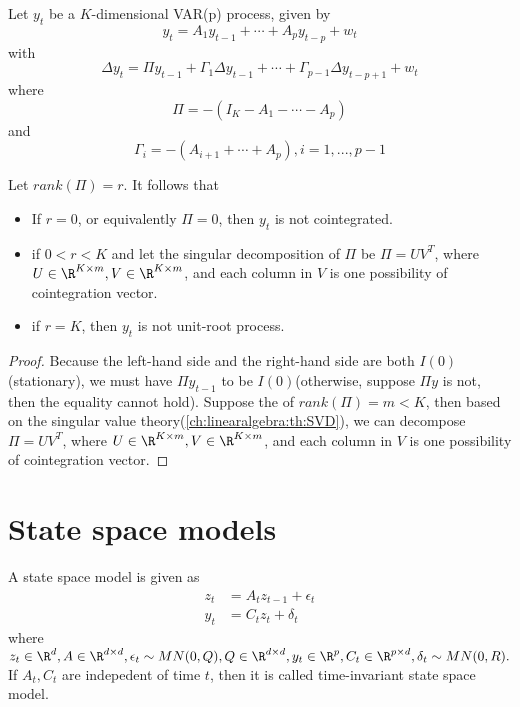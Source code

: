 \begin{lemma}\cite[248]{lutkepohl2005new}
Let $y_t$ be a $K$-dimensional VAR(p) process, given by
$$y_t = A_1y_{t-1} + \cdots + A_py_{t-p} + w_t$$
with
$$\Delta y_t = \Pi y_{t-1} + \Gamma_1\Delta y_{t-1} + \cdots + \Gamma_{p-1}\Delta y_{t-p+1} + w_t$$
where
$$\Pi = - (I_K - A_1 - \cdots - A_p)$$
and
$$\Gamma_i = -(A_{i+1}+\cdots + A_p), i=1,...,p-1$$

Let $rank(\Pi) = r$.
It follows that
\begin{itemize}
	\item If $r = 0$, or equivalently $\Pi = 0$, then $y_t$ is not cointegrated.
	\item if $0<r <K$ and let the singular decomposition of $\Pi$ be $\Pi = UV^T$, where $U\in \R^{K\times m}, V\in \R^{K\times m}$, and each column in $V$ is one possibility of cointegration vector. 
	\item if $r=K$, then $y_t$ is not unit-root process.
\end{itemize}


\end{lemma}
\begin{proof}	
Because the left-hand side and the right-hand side are both $I(0)$(stationary), we must have $\Pi y_{t-1}$ to be $I(0)$(otherwise, suppose $\Pi y$ is not, then the equality cannot hold).	
Suppose the of $rank(\Pi) = m < K$, then based on the singular value theory(\autoref{ch:linearalgebra:th:SVD}), we can decompose $\Pi = UV^T$, where $U\in \R^{K\times m}, V\in \R^{K\times m}$, and each column in $V$ is one possibility of cointegration vector. 

\end{proof}


\begin{note}\cite[249]{lutkepohl2005new}
\end{note}

\section{State space models}
\begin{definition}
A state space model is given as
\begin{align*}
z_t &= A_tz_{t-1} + \epsilon_t\\
y_t &=C_tz_t + \delta_t
\end{align*}
where $z_t\in \R^d,A\in \R^{d\times d}, \epsilon_t \sim MN(0,Q), Q\in \R^{d\times d}, y_t \in \R^p, C_t\in \R^{p\times d}, \delta_t \sim MN(0,R).$
If $A_t, C_t$ are indepedent of time $t$, then it is called time-invariant state space model.
\end{definition}


